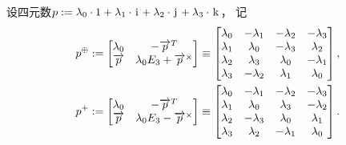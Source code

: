 \begin{definition}
设四元数\(
	p
	:=
	\lambda_0 \cdot 1
	+ \lambda_1 \cdot \kern1pt\mathrm{i}\kern1pt
	+ \lambda_2 \cdot \kern1pt\mathrm{j}\kern1pt
	+ \lambda_3 \cdot \kern1pt\mathrm{k}\kern1pt
\)，
记\begin{align*}
	p^\oplus
	&:=
	\begin{bmatrix}
		\lambda_0 & -\overrightarrow{p}^T \\
		\overrightarrow{p} & \lambda_0 E_3 + \overrightarrow{p}^\times \\
	\end{bmatrix}
	\equiv
	\begin{bmatrix}
		\lambda_0 & -\lambda_1 & -\lambda_2 & -\lambda_3 \\
		\lambda_1 & \lambda_0 & -\lambda_3 & \lambda_2 \\
		\lambda_2 & \lambda_3 & \lambda_0 & -\lambda_1 \\
		\lambda_3 & -\lambda_2 & \lambda_1 & \lambda_0 \\
	\end{bmatrix},
	\\
	p^+
	&:=
	\begin{bmatrix}
		\lambda_0 & -\overrightarrow{p}^T \\
		\overrightarrow{p} & \lambda_0 E_3 - \overrightarrow{p}^\times \\
	\end{bmatrix}
	\equiv
	\begin{bmatrix}
		\lambda_0 & -\lambda_1 & -\lambda_2 & -\lambda_3 \\
		\lambda_1 & \lambda_0 & \lambda_3 & -\lambda_2 \\
		\lambda_2 & -\lambda_3 & \lambda_0 & \lambda_1 \\
		\lambda_3 & \lambda_2 & -\lambda_1 & \lambda_0 \\
	\end{bmatrix}.
\end{align*}
\end{definition}


